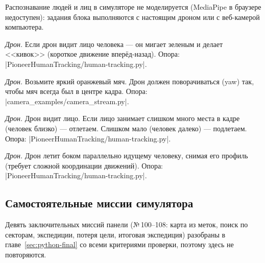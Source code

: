 Распознавание людей и лиц в симуляторе не моделируется (MediaPipe в браузере недоступен): задания блока выполняются с настоящим дроном или с веб-камерой компьютера.

\begin{taskbox}[(Б) Приветствие]
\emph{Дрон.} Если дрон видит лицо человека --- он мигает зеленым и делает <<кивок>> (короткое движение вперёд-назад).
Опора: \fpath|PioneerHumanTracking/human-tracking.py|.
\end{taskbox}

\begin{taskbox}
\emph{Дрон.} Возьмите яркий оранжевый мяч. Дрон должен поворачиваться (yaw) так, чтобы мяч всегда был в центре кадра.
Опора: \fpath|camera_examples/camera_stream.py|.
\end{taskbox}

\begin{taskbox}
\emph{Дрон.} Дрон видит лицо. Если лицо занимает слишком много места в кадре (человек близко) --- отлетаем. Слишком мало (человек далеко) --- подлетаем.
Опора: \fpath|PioneerHumanTracking/human-tracking.py|.
\end{taskbox}

\begin{taskbox}[(К) Оператор]
\emph{Дрон.} Дрон летит боком параллельно идущему человеку, снимая его профиль (требует сложной координации движений).
Опора: \fpath|PioneerHumanTracking/human-tracking.py|.
\end{taskbox}

\subsection{Самостоятельные миссии симулятора}

Девять заключительных миссий панели  (№\,100--108: карта из меток, поиск по секторам, экспедиции, потеря цели, итоговая экспедиция) разобраны в главе~\ref{sec:python-final} со всеми критериями проверки, поэтому здесь не повторяются.

